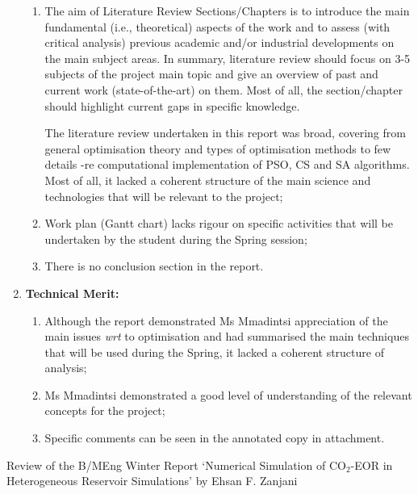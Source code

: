 \documentclass[14pt,twoside]{report}
\newcommand{\wrt}{{\it wrt }}
\begin{document}
\begin{enumerate}
\begin{enumerate}
                   \item The aim of Literature Review Sections/Chapters is to introduce the main fundamental (i.e., theoretical) aspects of the work and to assess (with critical analysis) previous academic and/or industrial developments on the main subject areas. In summary, literature review should focus on 3-5 subjects of the project main topic and give an overview of past and current work (state-of-the-art) on them. Most of all, the section/chapter should highlight current gaps in specific knowledge.
                     
                     The literature review undertaken in this report was broad, covering from general optimisation theory and types of optimisation methods to few details -re computational implementation of PSO, CS and SA algorithms. Most of all, it lacked a coherent structure of the main science and technologies that will be relevant to the project;
                   \item Work plan (Gantt chart) lacks rigour on specific activities that will be undertaken by the student during the Spring session;
                   \item There is no conclusion section in the report.
                \end{enumerate}
%
    \item {\bf Technical Merit:}
                \begin{enumerate}
                   \item Although the report demonstrated Ms Mmadintsi appreciation of the main issues \wrt to optimisation and had summarised the main techniques that will be used during the Spring, it lacked a coherent structure of analysis;
                   \item  Ms Mmadintsi demonstrated a good level of understanding of the relevant concepts for the project;
                   \item  Specific comments can be seen in the annotated copy in attachment.
                \end{enumerate}
%
\end{enumerate}

\medskip

\clearpage





\bigskip

\begin{center}
  {\Large Review of the B/MEng Winter Report `Numerical Simulation of CO$_{2}$-EOR in Heterogeneous Reservoir Simulations' by Ehsan F. Zanjani}
\end{center}
\end{document}
